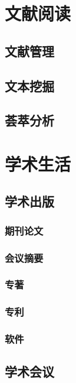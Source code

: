 \documentclass[]{book}
\begin{document}
\chapter{文献阅读}

\section{文献管理}

\section{文本挖掘}

\section{荟萃分析}

\chapter{学术生活}

\section{学术出版}

\subsection{期刊论文}

\subsection{会议摘要}

\subsection{专著}

\subsection{专利}

\subsection{软件}

\section{学术会议}
\end{document}
